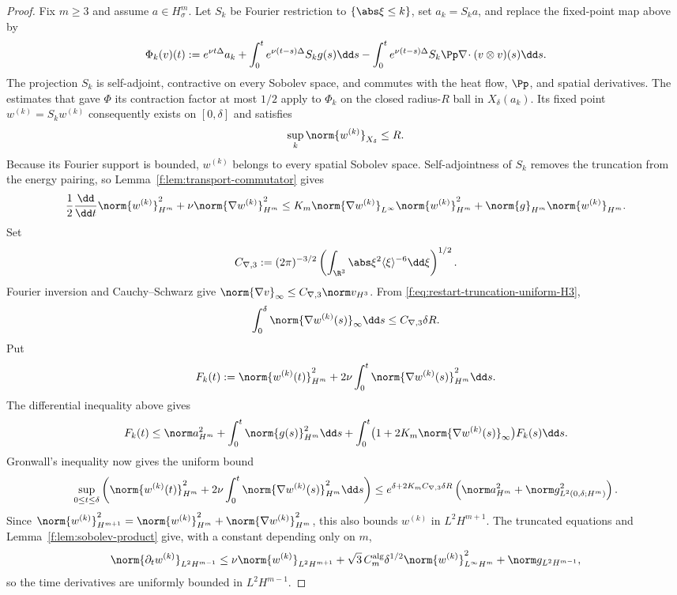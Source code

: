 \begin{proof}
Fix \(m\ge3\) and assume \(a\in H^m_\sigma\).  Let \(S_k\) be Fourier
restriction to \(\{\abs\xi\le k\}\), set \(a_k=S_ka\), and replace the
fixed-point map above by
\[
 \Phi_k(v)(t):=e^{\nu t\Delta}a_k
 +\int_0^te^{\nu(t-s)\Delta}S_kg(s)\dd s
 -\int_0^te^{\nu(t-s)\Delta}S_k\Pp\nabla\!\cdot
   (v\otimes v)(s)\dd s.
\]
The projection \(S_k\) is self-adjoint, contractive on every Sobolev space,
and commutes with the heat flow, \(\Pp\), and spatial derivatives.  The estimates that gave \(\Phi\) its contraction factor at most \(1/2\) apply to
\(\Phi_k\) on the closed radius-\(R\) ball in \(X_\delta(a_k)\).  Its fixed point
\(w^{(k)}=S_kw^{(k)}\) consequently exists on \([0,\delta]\) and satisfies
\begin{equation}
 \sup_k\norm{w^{(k)}}_{X_\delta}\le R.
 \label{f:eq:restart-truncation-uniform-H3}
\end{equation}
Because its Fourier support is bounded, \(w^{(k)}\) belongs to every spatial
Sobolev space.  Self-adjointness of \(S_k\) removes the truncation from the energy
pairing, so Lemma~\ref{f:lem:transport-commutator} gives
\[
 \frac12\frac{\dd}{\dd t}\norm{w^{(k)}}_{H^m}^2
 +\nu\norm{\nabla w^{(k)}}_{H^m}^2
 \le K_m\norm{\nabla w^{(k)}}_{L^\infty}
       \norm{w^{(k)}}_{H^m}^2
 +\norm{g}_{H^m}\norm{w^{(k)}}_{H^m}.
\]
Set
\[
 C_{\nabla,3}:=(2\pi)^{-3/2}
 \left(\int_{\R^3}\abs\xi^2\langle\xi\rangle^{-6}\dd\xi\right)^{1/2}.
\]
Fourier inversion and Cauchy--Schwarz give
\(\norm{\nabla v}_\infty\le C_{\nabla,3}\norm v_{H^3}\).  From
\eqref{f:eq:restart-truncation-uniform-H3},
\[
 \int_0^\delta\norm{\nabla w^{(k)}(s)}_\infty\dd s
 \le C_{\nabla,3}\delta R.
\]
Put
\[
 F_k(t):=\norm{w^{(k)}(t)}_{H^m}^2
 {}+2\nu\int_0^t\norm{\nabla w^{(k)}(s)}_{H^m}^2\dd s.
\]
The differential inequality above gives
\[
 F_k(t)\le\norm a_{H^m}^2
 {}+\int_0^t\norm{g(s)}_{H^m}^2\dd s
 {}+\int_0^t\bigl(1+2K_m\norm{\nabla w^{(k)}(s)}_\infty\bigr)
 F_k(s)\dd s.
\]
Gronwall's inequality now gives the uniform bound
\begin{equation}
 \sup_{0\le t\le\delta}\left(
 \norm{w^{(k)}(t)}_{H^m}^2
{}+2\nu\int_0^t\norm{\nabla w^{(k)}(s)}_{H^m}^2\dd s
 \right)
 \le e^{\delta+2K_mC_{\nabla,3}\delta R}
 \left(\norm a_{H^m}^2+\norm g_{L^2(0,\delta;H^m)}^2\right).
 \label{f:eq:restart-truncation-uniform-Hm}
\end{equation}
Since
\(
 \norm{w^{(k)}}_{H^{m+1}}^2
 =\norm{w^{(k)}}_{H^m}^2+\norm{\nabla w^{(k)}}_{H^m}^2
\), this also bounds \(w^{(k)}\) in \(L^2H^{m+1}\).  The truncated equations
and Lemma~\ref{f:lem:sobolev-product} give, with a constant depending only on
\(m\),
\[
 \norm{\partial_tw^{(k)}}_{L^2H^{m-1}}
 \le \nu\norm{w^{(k)}}_{L^2H^{m+1}}
 +\sqrt3\,C_m^{\rm alg}\delta^{1/2}
   \norm{w^{(k)}}_{L^\infty H^m}^2
  +\norm g_{L^2H^{m-1}},
\]
so the time derivatives are uniformly bounded in \(L^2H^{m-1}\).


\end{proof}
